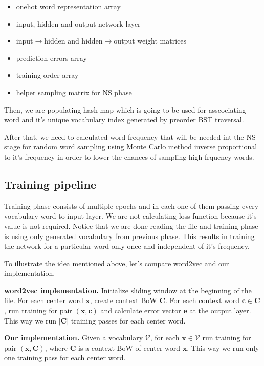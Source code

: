 \documentclass{article}
\begin{document}
\begin{itemize}
	\item onehot word representation array
	\item input, hidden and output network layer
	\item input$\rightarrow$hidden and hidden$\rightarrow$output weight matrices
	\item prediction errors array
	\item training order array
	\item helper sampling matrix for NS phase
\end{itemize}

\medbreak

Then, we are populating hash map which is going to be used for asscociating
word and it's unique vocabulary index generated by preorder BST traversal.

\medbreak

After that, we need to calculated word frequency that will be needed
int the NS stage for random word sampling using Monte Carlo method inverse
proportional to it's frequency in order to lower the chances of sampling
high-frquency words.

\subsection{Training pipeline}

Training phase consists of multiple epochs and in each one of them passing
every vocabulary word to input layer. We are not calculating loss function
because it's value is not required. Notice that we are done reading the file
and training phase is using only generated vocabulary from previous phase.
This results in training the network for a particular word only once and
independent of it's frequency.

\medbreak

To illustrate the idea mentioned above, let's compare word2vec and our implementation.

\textbf{word2vec implementation.}
Initialize sliding window at the beginning of the file. For each center word $\boldsymbol{x}$, create context BoW $\boldsymbol{C}$. For each context word $\boldsymbol{c} \in \boldsymbol{C}$, run training for pair $(\boldsymbol{x}, \boldsymbol{c})$ and calculate error vector $\boldsymbol{e}$ at the output layer. This way we run $|\boldsymbol{C}|$ training passes for each center word.

\textbf{Our implementation.}
Given a vocabulary $\mathcal{V}$, for each $\boldsymbol{x} \in \mathcal{V}$ run training for pair $(\boldsymbol{x}, \boldsymbol{C})$, where $\boldsymbol{C}$ is a context BoW of center word $\boldsymbol{x}$. This way we run only one training pass for each center word.
\end{document}
